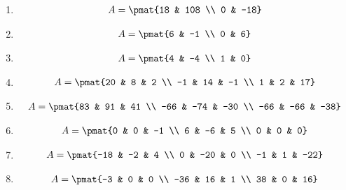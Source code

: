 \begin{enumerate}
\item

\begin{align*}
A = \pmat{18 & 108 \\ 0 & -18}
\end{align*}

\item

\begin{align*}
A = \pmat{6 & -1 \\ 0 & 6}
\end{align*}

\item

\begin{align*}
A = \pmat{4 & -4 \\ 1 & 0}
\end{align*}

\item

\begin{align*}
A = \pmat{20 & 8 & 2 \\ -1 & 14 & -1 \\ 1 & 2 & 17}
\end{align*}

\item

\begin{align*}
A = \pmat{83 & 91 & 41 \\ -66 & -74 & -30 \\ -66 & -66 & -38}
\end{align*}

\item

\begin{align*}
A = \pmat{0 & 0 & -1 \\ 6 & -6 & 5 \\ 0 & 0 & 0}
\end{align*}

\item

\begin{align*}
A = \pmat{-18 & -2 & 4 \\ 0 & -20 & 0 \\ -1 & 1 & -22}
\end{align*}

\item

\begin{align*}
A = \pmat{-3 & 0 & 0 \\ -36 & 16 & 1 \\ 38 & 0 & 16}
\end{align*}


\end{enumerate}
